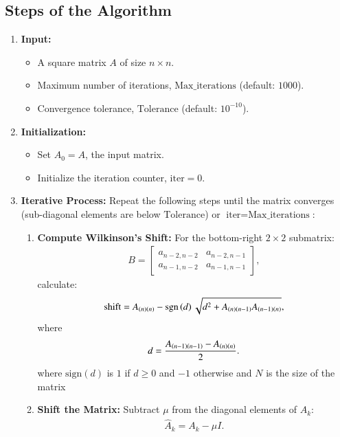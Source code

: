 \documentclass[journal]{IEEEtran}
\begin{document}
\subsection{Steps of the Algorithm}
\begin{enumerate}
    \item \textbf{Input:} 
    \begin{itemize}
        \item A square matrix $A$ of size $n \times n$.
        \item Maximum number of iterations, $\text{Max\_iterations}$ (default: $1000$).
        \item Convergence tolerance, $\text{Tolerance}$ (default: $10^{-10}$).
    \end{itemize}

    \item \textbf{Initialization:} 
    \begin{itemize}
        \item Set $A_0 = A$, the input matrix.
        \item Initialize the iteration counter, $\text{iter} = 0$.
    \end{itemize}

    \item \textbf{Iterative Process:}
    Repeat the following steps until the matrix converges (sub-diagonal elements are below $\text{Tolerance}$) or $\text{iter} = \text{Max\_iterations}$:
    
    \begin{enumerate}
        \item \textbf{Compute Wilkinson's Shift:} For the bottom-right $2 \times 2$ submatrix:
        \begin{align}
        B = \begin{bmatrix}
        a_{n-2,n-2} & a_{n-2,n-1} \\
        a_{n-1,n-2} & a_{n-1,n-1}
        \end{bmatrix},
        \end{align}
        calculate:
       \begin{align}
            \text{shift} = A_{\left(n\right)\left(n\right)} - \mathop{\mathrm{sgn}}\left(d\right) \sqrt{d^2 + A_{\left(n\right)\left(n-1\right)} A_{\left(n-1\right)\left(n\right)}},
            \end{align}
        where
        \begin{align}
        d = \frac{A_{\left(n-1\right)\left(n-1\right)} - A_{\left(n\right)\left(n\right)}}{2}.
        \end{align}
        where $\text{sign}(d)$ is $1$ if $d \geq 0$ and $-1$ otherwise and $N$ is the size of the matrix
        \item \textbf{Shift the Matrix:} Subtract $\mu$ from the diagonal elements of $A_k$:
        \begin{align}
        \hat{A}_k = A_k - \mu I.
        \end{align}


\end{enumerate}
\end{enumerate}
\end{document}

